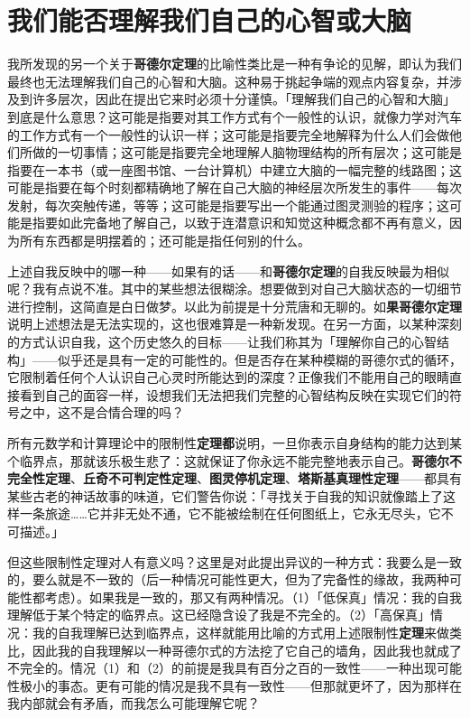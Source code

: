 \documentclass[
  12pt,
  twoside,
  openright,
  oldfontcommands,
]{memoir}
\newcommand{\heititext}[1]{{\heifamily\bfseries #1}}
\begin{document}
\section{我们能否理解我们自己的心智或大脑}

我所发现的另一个关于\heititext{哥德尔定理}的比喻性类比是一种有争论的见解，即认为我们最终也无法理解我们自己的心智和大脑。这种易于挑起争端的观点内容复杂，并涉及到许多层次，因此在提出它来时必须十分谨慎。「理解我们自己的心智和大脑」到底是什么意思？这可能是指要对其工作方式有个一般性的认识，就像力学对汽车的工作方式有一个一般性的认识一样；这可能是指要完全地解释为什么人们会做他们所做的一切事情；这可能是指要完全地理解人脑物理结构的所有层次；这可能是指要在一本书（或一座图书馆、一台计算机）中建立大脑的一幅完整的线路图；这可能是指要在每个时刻都精确地了解在自己大脑的神经层次所发生的事件------每次发射，每次突触传递，等等；这可能是指要写出一个能通过图灵测验的程序；这可能是指要如此完备地了解自己，以致于连潜意识和知觉这种概念都不再有意义，因为所有东西都是明摆着的；还可能是指任何别的什么。

上述自我反映中的哪一种------如果有的话------和\heititext{哥德尔定理}的自我反映最为相似呢？我有点说不准。其中的某些想法很糊涂。想要做到对自己大脑状态的一切细节进行控制，这简直是白日做梦。以此为前提是十分荒唐和无聊的。如\heititext{果哥德尔定理}说明上述想法是无法实现的，这也很难算是一种新发现。在另一方面，以某种深刻的方式认识自我，这个历史悠久的目标------让我们称其为「理解你自己的心智结构」------似乎还是具有一定的可能性的。但是否存在某种模糊的哥德尔式的循环，它限制着任何个人认识自己心灵时所能达到的深度？正像我们不能用自己的眼睛直接看到自己的面容一样，设想我们无法把我们完整的心智结构反映在实现它们的符号之中，这不是合情合理的吗？

所有元数学和计算理论中的限制性\heititext{定理都}说明，一旦你表示自身结构的能力达到某个临界点，那就该乐极生悲了：这就保证了你永远不能完整地表示自己。\heititext{哥德尔不完全性定理}、\heititext{丘奇不可判定性定理}、\heititext{图灵停机定理}、\heititext{塔斯基真理性定理}------都具有某些古老的神话故事的味道，它们警告你说：「寻找关于自我的知识就像踏上了这样一条旅途\ldots\ldots 它并非无处不通，它不能被绘制在任何图纸上，它永无尽头，它不可描述。」

但这些限制性定理对人有意义吗？这里是对此提出异议的一种方式：我要么是一致的，要么就是不一致的（后一种情况可能性更大，但为了完备性的缘故，我两种可能性都考虑）。如果我是一致的，那又有两种情况。（1）「低保真」情况：我的自我理解低于某个特定的临界点。这已经隐含设了我是不完全的。（2）「高保真」情况：我的自我理解已达到临界点，这样就能用比喻的方式用上述限制性\heititext{定理}来做类比，因此我的自我理解以一种哥德尔式的方法挖了它自己的墙角，因此我也就成了不完全的。情况（1）和（2）的前提是我具有百分之百的一致性------一种出现可能性极小的事态。更有可能的情况是我不具有一致性------但那就更坏了，因为那样在我内部就会有矛盾，而我怎么可能理解它呢？
\end{document}
